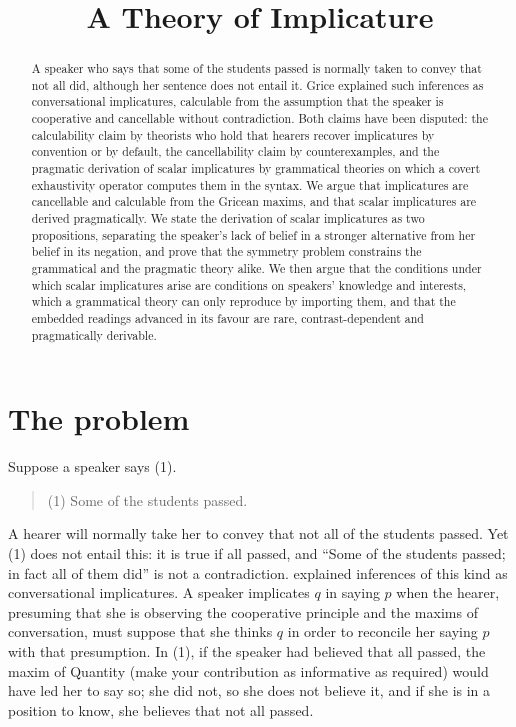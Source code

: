 \documentclass{situationist-preprint}
\title{A Theory of Implicature}
\begin{document}
\maketitle

\begin{abstract}
A speaker who says that some of the students passed is normally taken to convey that not all did, although her sentence does not entail it. Grice explained such inferences as conversational implicatures, calculable from the assumption that the speaker is cooperative and cancellable without contradiction. Both claims have been disputed: the calculability claim by theorists who hold that hearers recover implicatures by convention or by default, the cancellability claim by counterexamples, and the pragmatic derivation of scalar implicatures by grammatical theories on which a covert exhaustivity operator computes them in the syntax. We argue that implicatures are cancellable and calculable from the Gricean maxims, and that scalar implicatures are derived pragmatically. We state the derivation of scalar implicatures as two propositions, separating the speaker's lack of belief in a stronger alternative from her belief in its negation, and prove that the symmetry problem constrains the grammatical and the pragmatic theory alike. We then argue that the conditions under which scalar implicatures arise are conditions on speakers' knowledge and interests, which a grammatical theory can only reproduce by importing them, and that the embedded readings advanced in its favour are rare, contrast-dependent and pragmatically derivable.
\end{abstract}

\section{The problem}

Suppose a speaker says (1).
\begin{quote}
(1) Some of the students passed.
\end{quote}
A hearer will normally take her to convey that not all of the students passed. Yet (1) does not entail this: it is true if all passed, and \enquote{Some of the students passed; in fact all of them did} is not a contradiction. \citet{Grice1975} explained inferences of this kind as conversational implicatures. A speaker implicates $q$ in saying $p$ when the hearer, presuming that she is observing the cooperative principle and the maxims of conversation, must suppose that she thinks $q$ in order to reconcile her saying $p$ with that presumption. In (1), if the speaker had believed that all passed, the maxim of Quantity (make your contribution as informative as required) would have led her to say so; she did not, so she does not believe it, and if she is in a position to know, she believes that not all passed.
\end{document}
